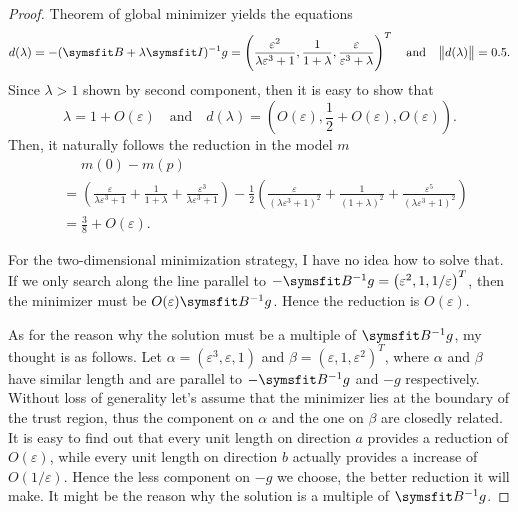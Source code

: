 \documentclass{assignment}[2019/10/15]
\newcommand{\B}{\matr{B}}
\newcommand{\Bi}{\matr{B}^{-1}}
\begin{document}
    \begin{proof}
        Theorem of global minimizer yields the equations
        \begin{equation}
            d(\lambda)=-(\B+\lambda\matr{I})^{-1}g=\left(\frac{\varepsilon^2}{\lambda\varepsilon^3+1},\frac{1}{1+\lambda},\frac{\varepsilon}{\varepsilon^3+\lambda}\right)^T
            \quad\text{and}\quad
            \norm{d(\lambda)}=0.5.
        \end{equation}
        Since $\lambda>1$ shown by second component, then it is easy to show that
        \begin{equation}
            \lambda=1+O(\varepsilon)
            \quad\text{and}\quad
            d(\lambda)=\left(O(\varepsilon), \frac{1}{2}+O(\varepsilon), O(\varepsilon)\right).
        \end{equation}
        Then, it naturally follows the reduction in the model $m$
        \begin{equation}
            \begin{aligned}
                &\phantom{{}={}}m(0)-m(p)\\
                &=\left(\frac{\varepsilon}{\lambda\varepsilon^3+1}+\frac{1}{1+\lambda}+\frac{\varepsilon^3}{\lambda\varepsilon^3+1}\right)-\frac{1}{2}\left(\frac{\varepsilon}{\left(\lambda\varepsilon^3+1\right)^2}+\frac{1}{\left(1+\lambda\right)^2}+\frac{\varepsilon^5}{\left(\lambda\varepsilon^3+1\right)^2}\right)\\
                &=\frac{3}{8}+O(\varepsilon).
            \end{aligned}
        \end{equation}

        For the two-dimensional minimization strategy, I have no idea how to solve that. If we only search along the line parallel to $-\Bi g=\left(\varepsilon^2, 1, 1/\varepsilon\right)^T$, then the minimizer must be $O(\varepsilon)\Bi g$. Hence the reduction is $O(\varepsilon)$.

        As for the reason why the solution must be a multiple of $\Bi g$, my thought is as follows. Let $\alpha = (\varepsilon^3, \varepsilon, 1)$ and $\beta = (\varepsilon, 1, \varepsilon^2)^T$, where $\alpha$ and $\beta$ have similar length and are parallel to $-\Bi g$ and $-g$ respectively. Without loss of generality let's assume that the minimizer lies at the boundary of the trust region, thus the component on $\alpha$ and the one on $\beta$ are closedly related. It is easy to find out that every unit length on direction $a$ provides a reduction of $O(\varepsilon)$, while every unit length on direction $b$ actually provides a increase of $O(1/\varepsilon)$. Hence the less component on $-g$ we choose, the better reduction it will make. It might be the reason why the solution is a multiple of $\Bi g$.
    \end{proof}
\end{document}
